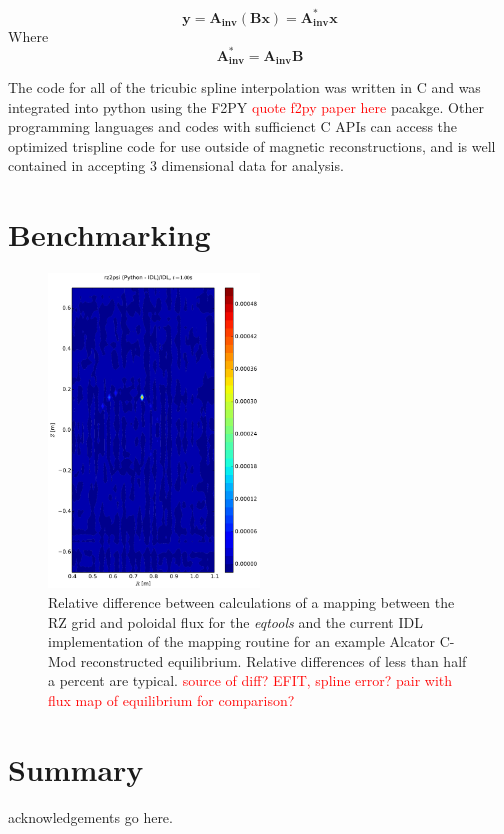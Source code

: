 \documentclass[12pt,floatfix,showpacs]{revtex4-1}
\newcommand{\note}[1]{\textcolor{red}{#1}}
\begin{document}
\begin{equation}
\boldsymbol{y} = \boldsymbol{A_{inv}} ( \boldsymbol{B} \boldsymbol{x}) = \boldsymbol{A_{inv}^*}\boldsymbol{x}
\end{equation}
Where
\begin{equation}
\boldsymbol{A_{inv}^*} = \boldsymbol{A_{inv}}\boldsymbol{B} 
\end{equation}

The code for all of the tricubic spline interpolation was written in C and was integrated into python using the F2PY \note{quote f2py paper here} pacakge. Other programming languages and codes with sufficienct C APIs can access the optimized trispline code for use outside of magnetic reconstructions, and is well contained in accepting 3 dimensional data for analysis.





\section{Benchmarking}\label{sec:benchmark}

\begin{figure}[ht]
 \includegraphics[width=0.5\textwidth]{graphics/RZ2psi_rel_diff.pdf}
 \caption{Relative difference between calculations of a mapping between the RZ grid and poloidal flux for the \emph{eqtools} and the current IDL implementation of the mapping routine for an example Alcator C-Mod reconstructed equilibrium.  Relative differences of less than half a percent are typical.  \note{source of diff?  EFIT, spline error?  pair with flux map of equilibrium for comparison?}}
 \label{fig:rz2psi_diff}
\end{figure}

\section{Summary}\label{sec:summary}


\begin{acknowledgements}
 acknowledgements go here.
\end{acknowledgements}



\end{document}
